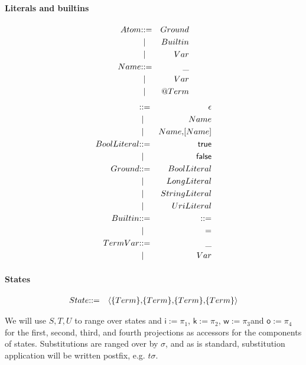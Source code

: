 \paragraph{Literals and builtins}
\begin{eqnarray*}
  Atom & \mathbin{\mathbf{::=}} & Ground \\
  & \;\mathbin{\mathbf\mid} \; & Builtin \\
  & \;\mathbin{\mathbf\mid} \; & Var \\
  Name & \mathbin{\mathbf{::=}} & \mathsf{\_} \\
  & \;\mathbin{\mathbf\mid} \; & Var \\
  & \;\mathbin{\mathbf\mid} \; & \mathsf{@} Term
\end{eqnarray*}
\begin{eqnarray*}  
  [Name] & \bc & \epsilon \\
  & \;\bm \; & Name \\
  & \;\bm \; & Name \mathsf{,} [Name] \\
  BoolLiteral & \bc & \mathsf{true} \\
 & \;\bm \; & \mathsf{false} \\
  Ground & \bc & BoolLiteral \\
  & \;\bm \; & LongLiteral \\
  & \;\bm \; & StringLiteral \\
  & \;\bm \; & UriLiteral \\
  Builtin & \bc & \mathsf{\bc} \\
  & \;\bm \; & \mathsf{=} \\
  TermVar & \bc & \mathsf{\_} \\
  & \;\bm \; & Var \\
\end{eqnarray*}

\paragraph{States}
\begin{eqnarray*}
  State & \mathbin{\mathbf{::=}} & \langle \mathsf{\{}Term\mathsf{\}} \mathsf{,} \mathsf{\{}Term\mathsf{\}} \mathsf{,} \mathsf{\{}Term\mathsf{\}} \mathsf{,} \mathsf{\{}Term\mathsf{\}} \rangle
\end{eqnarray*}

We will use $S, T, U$ to range over states and $\mathsf{i} := \pi_{1}$, $\mathsf{k} := \pi_{2}$, $\mathsf{w} := \pi_{3}$and $\mathsf{o} := \pi_{4}$ for the first, second, third, and fourth projections as accessors for the components of states. Substitutions are ranged over by $\sigma$, and as is standard, substitution application will be written postfix, e.g. $t\sigma$.

